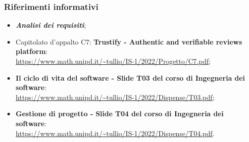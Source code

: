     \subsubsection{Riferimenti informativi}
    \begin{itemize}
        \item \textbf{\textit{Analisi dei requisiti}};
        \item Capitolato d'appalto C7: \textbf{Trustify - Authentic and verifiable reviews platform}: \\
        \url{https://www.math.unipd.it/~tullio/IS-1/2022/Progetto/C7.pdf};
        \item \textbf{Il ciclo di vita del software - Slide T03 del corso di Ingegneria dei software}: \\
        \url{https://www.math.unipd.it/~tullio/IS-1/2022/Dispense/T03.pdf};
        \item \textbf{Gestione di progetto - Slide T04 del corso di Ingegneria dei software}: \\
        \url{https://www.math.unipd.it/~tullio/IS-1/2022/Dispense/T04.pdf}.
    \end{itemize}

